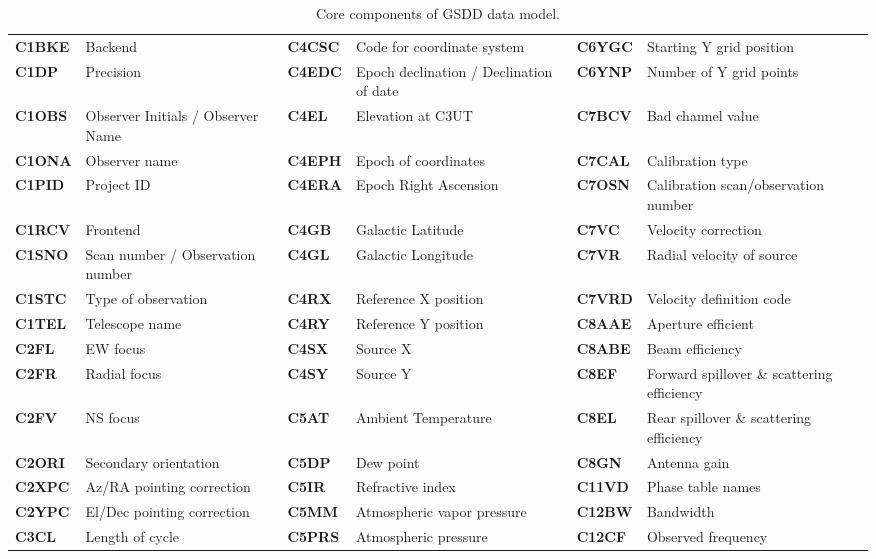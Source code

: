 \documentclass[final,authoryear,5p,times,twocolumn]{elsarticle}
\begin{document}
\begin{table}[t]
\centering
\caption{Core components of GSDD data model.}
\label{tab:core}
\begin{tabular}{|lp{1.5in}|lp{1.5in}|lp{1.5in}|}
\hline
\textbf{C1BKE} & Backend & \textbf{C4CSC} & Code for coordinate system & \textbf{C6YGC} & Starting Y grid position \\
\textbf{C1DP} & Precision & \textbf{C4EDC} & Epoch declination / Declination of date & \textbf{C6YNP} & Number of Y grid points \\
\textbf{C1OBS} & Observer Initials / Observer Name & \textbf{C4EL} & Elevation at C3UT & \textbf{C7BCV} & Bad channel value \\
\textbf{C1ONA} & Observer name & \textbf{C4EPH} & Epoch of coordinates & \textbf{C7CAL} & Calibration type \\
\textbf{C1PID} & Project ID & \textbf{C4ERA} & Epoch Right Ascension & \textbf{C7OSN} & Calibration scan/observation number \\
\textbf{C1RCV} & Frontend & \textbf{C4GB} & Galactic Latitude & \textbf{C7VC} & Velocity correction \\
\textbf{C1SNO} & Scan number / Observation number & \textbf{C4GL} & Galactic Longitude & \textbf{C7VR} & Radial velocity of source \\
\textbf{C1STC} & Type of observation & \textbf{C4RX} & Reference X position & \textbf{C7VRD} & Velocity definition code \\
\textbf{C1TEL} & Telescope name & \textbf{C4RY} & Reference Y position & \textbf{C8AAE} & Aperture efficient \\
\textbf{C2FL} & EW focus & \textbf{C4SX} & Source X & \textbf{C8ABE} & Beam efficiency \\
\textbf{C2FR} & Radial focus & \textbf{C4SY} & Source Y & \textbf{C8EF} & Forward spillover \& scattering efficiency \\
\textbf{C2FV} & NS focus & \textbf{C5AT} & Ambient Temperature & \textbf{C8EL} & Rear spillover \& scattering efficiency \\
\textbf{C2ORI} & Secondary orientation & \textbf{C5DP} & Dew point & \textbf{C8GN} & Antenna gain \\
\textbf{C2XPC} & Az/RA pointing correction & \textbf{C5IR} & Refractive index & \textbf{C11VD} & Phase table names \\
\textbf{C2YPC} & El/Dec pointing correction & \textbf{C5MM} & Atmospheric vapor pressure & \textbf{C12BW} & Bandwidth \\
\textbf{C3CL} & Length of cycle & \textbf{C5PRS} & Atmospheric pressure & \textbf{C12CF} & Observed frequency \\

\end{tabular}
\end{table}
\end{document}

